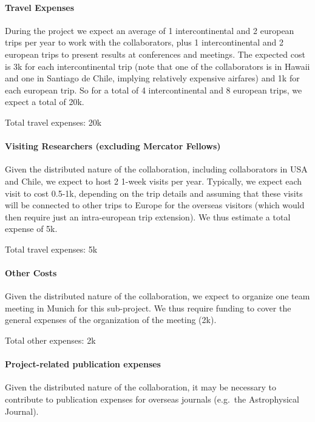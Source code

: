 \documentclass[10pt,fleqn,twoside]{article}
\begin{document}
\paragraph{Travel Expenses}

During the project we expect an average of 1 intercontinental and 2 european
trips per year to work with the collaborators, plus 1 intercontinental and 2
european trips to present results at conferences and meetings. The expected
cost is 3k\EUR{} for each intercontinental trip (note that one of the
collaborators is in Hawaii and one in Santiago de Chile, implying relatively
expensive airfares) and 1k\EUR{} for each european trip. So for a total of
4 intercontinental and 8 european trips, we expect a total of 20k\EUR{}.  \smallskip

Total travel expenses: 20k\EUR{}


\paragraph{Visiting Researchers (excluding Mercator Fellows)}

Given the distributed nature of the collaboration, including collaborators in USA and Chile, we expect to host 2 1-week visits per year. Typically, we expect each visit to cost 0.5-1k\EUR{}, depending on the trip details and assuming that these visits will be connected to other trips to Europe for the overseas visitors (which would then require just an intra-european trip extension). We thus estimate a total expense of 5k\EUR{}.
\smallskip

Total travel expenses: 5k\EUR{}

\paragraph{Other Costs}

Given the distributed nature of the collaboration, we expect to organize one team meeting in 
Munich for this sub-project. We thus require funding to cover the general expenses of the 
organization of the meeting (2k\EUR{}).\smallskip
 

Total other expenses: 2k\EUR{}

\paragraph{Project-related publication expenses}

Given the distributed nature of the collaboration, it may be necessary to contribute to publication expenses for overseas journals (e.g.\ the Astrophysical Journal). \smallskip
\end{document}
